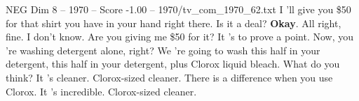 \begin{textsample}{NEG Dim 8 – 1970 – Score -1.00 – 1970/tv\_com\_1970\_62.txt}  \label{ex:f8_neg_010}
I 'll give you \$50 for that shirt you have in your hand right there.
Is it a deal? \textbf{Okay}.
All right, fine.
I don't know.
Are you giving me \$50 for it?
It 's to prove a point.
Now, you 're washing detergent alone, right?
We 're going to wash this half in your detergent, this half in your detergent, plus Clorox liquid bleach.
What do you think?
It 's cleaner.
Clorox-sized cleaner.
There is a difference when you use Clorox.
It 's incredible.
Clorox-sized cleaner.

\end{textsample}
